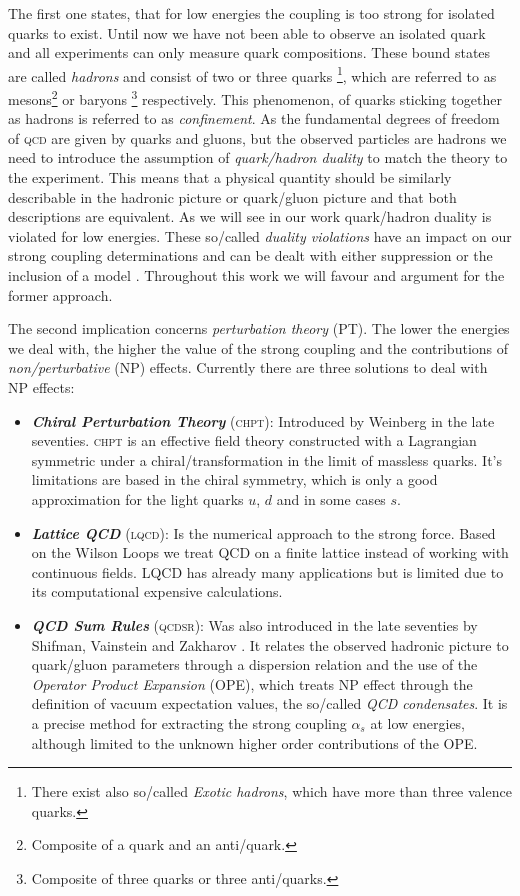 \documentclass[../../index.tex]{subfiles}
\begin{document}
The first one states, that for low energies the coupling is too strong for
isolated quarks to exist. Until now we have not been able to observe an isolated
quark and all experiments can only measure quark compositions. These bound
states are called \textit{hadrons} and consist of two or three quarks
\footnote{There exist also so\-/called \textit{Exotic hadrons}, which have more
  than three valence quarks.}, which are referred to as
mesons\footnote{Composite of a quark and an anti\-/quark.} or baryons
\footnote{Composite of three quarks or three anti\-/quarks.} respectively. This
phenomenon, of quarks sticking together as hadrons is referred to as
\textit{confinement}. As the fundamental degrees of freedom of \textsc{qcd} are
given by quarks and gluons, but the observed particles are hadrons we need to
introduce the assumption of \textit{quark\-/hadron duality} to match the theory
to the experiment. This means that a physical quantity should be similarly
describable in the hadronic picture or quark\-/gluon picture and that both
descriptions are equivalent. As we will see in our work quark\-/hadron duality
is violated for low energies. These so\-/called \textit{duality violations} have
an impact on our strong coupling determinations and can be dealt with either
suppression or the inclusion of a model \cite{Pich2006,Cata2008}. Throughout
this work we will favour and argument for the former approach.

The second implication concerns \textit{perturbation theory} (PT). The lower the
energies we deal with, the higher the value of the strong coupling and the
contributions of \textit{non\-/perturbative} (NP) effects. Currently there are
three solutions to deal with NP effects:
\begin{itemize}
\item \textbf{\textit{Chiral Perturbation Theory}} (\textsc{chpt}): Introduced
  by Weinberg \cite{Weinberg1978} in the late seventies. \textsc{chpt} is an
  effective field theory constructed with a Lagrangian symmetric under a
  chiral\-/transformation in the limit of massless quarks. It's limitations are
  based in the chiral symmetry, which is only a good approximation for the light
  quarks $u$, $d$ and in some cases $s$.
\item \textbf{\textit{Lattice QCD}} (\textsc{lqcd}): Is the numerical approach
  to the strong force. Based on the Wilson Loops \cite{Wilson1974} we treat QCD
  on a finite lattice instead of working with continuous fields. LQCD has
  already many applications but is limited due to its computational expensive
  calculations.
\item \textbf{\textit{QCD Sum Rules}} (\textsc{qcdsr}): Was also introduced in
  the late seventies by Shifman, Vainstein and Zakharov
  \cite{Shifman1978,Shifman1978a}. It relates the observed hadronic picture to
  quark\-/gluon parameters through a dispersion relation and the use of the
  \textit{Operator Product Expansion} (OPE), which treats NP effect through the
  definition of vacuum expectation values, the so\-/called \textit{QCD
    condensates}. It is a precise method for extracting the strong coupling
  $\alpha_s$ at low energies, although limited to the unknown higher order
  contributions of the OPE.
\end{itemize}
\end{document}
